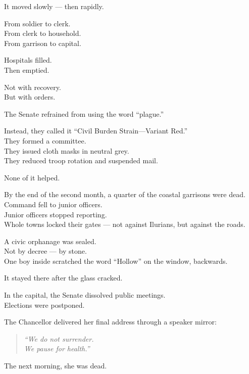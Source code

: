\documentclass[12pt]{article}
\begin{document}
It moved slowly — then rapidly.

From soldier to clerk.\\
From clerk to household.\\
From garrison to capital.

Hospitals filled.\\
Then emptied.

Not with recovery.\\
But with orders.

\vspace{1em}

The Senate refrained from using the word “plague.”

Instead, they called it “Civil Burden Strain—Variant Red.”\\
They formed a committee.\\
They issued cloth masks in neutral grey.\\
They reduced troop rotation and suspended mail.

None of it helped.

\vspace{1em}

By the end of the second month, a quarter of the coastal garrisons were dead.\\
Command fell to junior officers.\\
Junior officers stopped reporting.\\
Whole towns locked their gates — not against Ilurians, but against the roads.

A civic orphanage was sealed.\\
Not by decree — by stone.\\
One boy inside scratched the word “Hollow” on the window, backwards.

It stayed there after the glass cracked.

\vspace{1em}

In the capital, the Senate dissolved public meetings.\\
Elections were postponed.

The Chancellor delivered her final address through a speaker mirror:

\begin{quote}
\textit{“We do not surrender.}\\
\textit{We pause for health.”}
\end{quote}

The next morning, she was dead.
\end{document}
